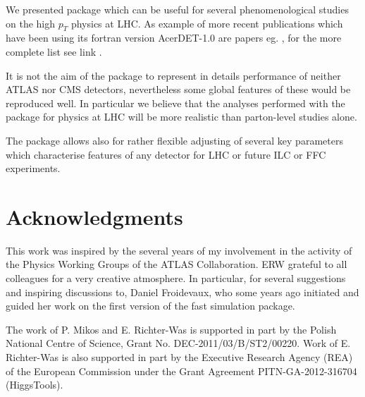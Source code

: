 We presented package which can be useful for several
phenomenological studies on the high $p_T$ physics at LHC.
As example of more recent publications which have been using
its fortran version AcerDET-1.0 \cite{AcerDET-1.0} are papers eg. 
\cite{Nagata2015, Schaetzel2014, Choi2012, Aguilar-Saavedra2012},
for the more complete list see link \cite{AcerDET-1.0-citations}. 

It is not the aim of the package to represent in details performance of
neither ATLAS nor CMS detectors, nevertheless some global features
of these would be reproduced well. In particular we believe that the
analyses performed with the package for physics at LHC will be more
realistic than parton-level studies alone.

The package allows also for rather flexible 
adjusting of several key parameters which characterise features of any
detector for LHC or future ILC or FFC experiments. 


\section*{Acknowledgments}

This work was inspired by the several years of my involvement in the activity 
of the  Physics Working Groups of the ATLAS Collaboration.
ERW  grateful to all colleagues for a very creative atmosphere.
In particular, for several suggestions and inspiring discussions to,
Daniel Froidevaux, who  some years ago initiated and guided 
her work on the first version of the fast simulation package.

The work of P. Mikos and E. Richter-Was is supported in part by the Polish National 
Centre of Science, Grant No. DEC-2011/03/B/ST2/00220. 
Work of E. Richter-Was is also supported  in part by  the Executive Research Agency (REA) 
of the European Commission under the Grant Agreement PITN-GA-2012-316704 (HiggsTools).

